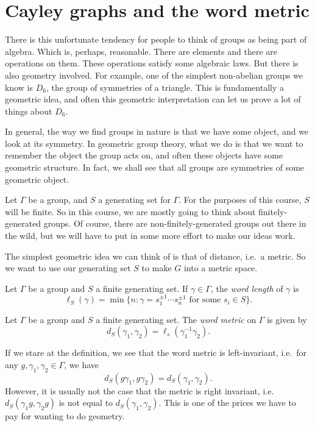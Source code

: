 \documentclass[a4paper]{article}
\begin{document}
\tableofcontents

\section{Cayley graphs and the word metric}
There is this unfortunate tendency for people to think of groups as being part of algebra. Which is, perhaps, reasonable. There are elements and there are operations on them. These operations satisfy some algebraic laws. But there is also geometry involved. For example, one of the simplest non-abelian groups we know is $D_6$, the group of symmetries of a triangle. This is fundamentally a geometric idea, and often this geometric interpretation can let us prove a lot of things about $D_6$.

In general, the way we find groups in nature is that we have some object, and we look at its symmetry. In geometric group theory, what we do is that we want to remember the object the group acts on, and often these objects have some geometric structure. In fact, we shall see that all groups are symmetries of some geometric object.

Let $\Gamma$ be a group, and $S$ a generating set for $\Gamma$. For the purposes of this course, $S$ will be finite. So in this course, we are mostly going to think about finitely-generated groups. Of course, there are non-finitely-generated groups out there in the wild, but we will have to put in some more effort to make our ideas work.

The simplest geometric idea we can think of is that of distance, i.e.\ a metric. So we want to use our generating set $S$ to make $G$ into a metric space.

\begin{defi}
  Let $\Gamma$ be a group and $S$ a finite generating set. If $\gamma \in \Gamma$, the \emph{word length} of $\gamma$ is
  \[
    \ell_S(\gamma) = \min \{n : \gamma = s_1^{\pm 1} \cdots s_n^{\pm 1}\text{ for some } s_i \in S\}.
  \]
\end{defi}

\begin{defi}
  Let $\Gamma$ be a group and $S$ a finite generating set. The \emph{word metric} on $\Gamma$ is given by
  \[
    d_S (\gamma_1, \gamma_2) = \ell_s(\gamma_1^{-1} \gamma_2).
  \]
\end{defi}

If we stare at the definition, we see that the word metric is left-invariant, i.e.\ for any $g, \gamma_1, \gamma_2 \in \Gamma$, we have
\[
  d_S(g \gamma_1, g \gamma_2) = d_S(\gamma_1, \gamma_2).
  \]
However, it is usually not the case that the metric is right invariant, i.e.\ $d_S(\gamma_1 g, \gamma_2 g)$ is not equal to $d_S(\gamma_1, \gamma_2)$. This is one of the prices we have to pay for wanting to do geometry.
\end{document}
